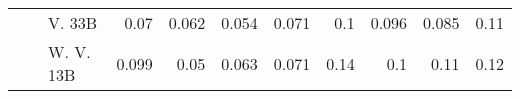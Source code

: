 \begin{table}[!htbp]
\begin{tabular}{l|l|l|rrrr|rrrr}
 &  & V. 33B    & {\cellcolor[HTML]{9FCAE1}} \color[HTML]{000000} 0.07 & {\cellcolor[HTML]{B0D2E7}} \color[HTML]{000000} 0.062 & {\cellcolor[HTML]{C2D9EE}} \color[HTML]{000000} 0.054 & {\cellcolor[HTML]{9CC9E1}} \color[HTML]{000000} 0.071    & {\cellcolor[HTML]{FCB69B}} \color[HTML]{000000} 0.1 & {\cellcolor[HTML]{FCBBA1}} \color[HTML]{000000} 0.096 & {\cellcolor[HTML]{FDC6B0}} \color[HTML]{000000} 0.085 & {\cellcolor[HTML]{FCA98C}} \color[HTML]{000000} 0.11 \\
 &  & W. V. 13B  & {\cellcolor[HTML]{56A0CE}} \color[HTML]{F1F1F1} 0.099 & {\cellcolor[HTML]{C8DCF0}} \color[HTML]{000000} 0.05 & {\cellcolor[HTML]{AED1E7}} \color[HTML]{000000} 0.063 & {\cellcolor[HTML]{9CC9E1}} \color[HTML]{000000} 0.071    & {\cellcolor[HTML]{FC8565}} \color[HTML]{F1F1F1} 0.14 & {\cellcolor[HTML]{FCB499}} \color[HTML]{000000} 0.1 & {\cellcolor[HTML]{FCA98C}} \color[HTML]{000000} 0.11 & {\cellcolor[HTML]{FC9879}} \color[HTML]{000000} 0.12 \\


\end{tabular}
\end{table}
